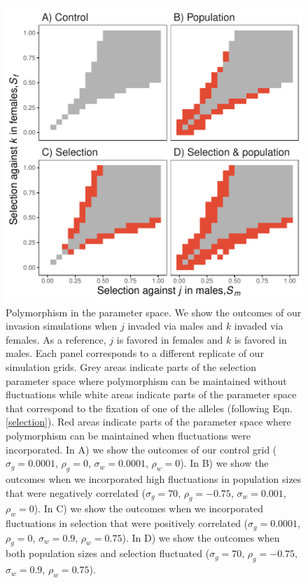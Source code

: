 \documentclass[12pt]{article}
\begin{document}
\begin{figure}[H]
  \centerline{\includegraphics[]{outcomes.pdf}}
  \caption{  Polymorphism in the parameter space. We show the outcomes of our invasion simulations  when $j$ invaded via males and $k$ invaded via females. As a reference, $j$ is favored in females and $k$ is favored in males. Each panel corresponds to a different replicate of our simulation grids. Grey areas indicate parts of the selection parameter space where polymorphism can be maintained without fluctuations while white areas indicate parts of the parameter space that correspond to the fixation of one of the alleles (following Eqn.\ref{selection}). Red areas indicate parts of the parameter space where polymorphism can be maintained when fluctuations were incorporated. In A) we show the outcomes of our control grid ($\sigma_{g}=0.0001$, $\rho_{g}=0$, $\sigma_{w}=0.0001$, $\rho_{w}=0$). In B) we show the outcomes when we incorporated high fluctuations in population sizes that were negatively correlated ($\sigma_{g}=70$, $\rho_{g}=-0.75$, $\sigma_{w}=0.001$, $\rho_{w}=0$). In C) we show the outcomes when we incorporated fluctuations in selection that were positively correlated  ($\sigma_{g}=0.0001$, $\rho_{g}=0$, $\sigma_{w}=0.9$, $\rho_{w}=0.75$). In D) we show the outcomes when both population sizes and selection fluctuated ($\sigma_{g}=70$, $\rho_{g}=-0.75$, $\sigma_{w}=0.9$, $\rho_{w}=0.75$). }
    \label{fig:outcomes}
\end{figure}
\end{document}
